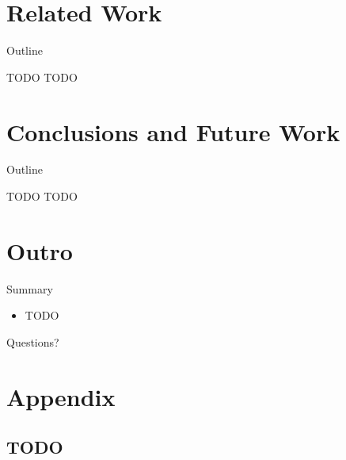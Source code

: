 \note{
}


\section{Related Work}

\begin{frame}{Outline}
  \tableofcontents[current]
\end{frame}

\note{
}

\begin{frame}{TODO}
  TODO
\end{frame}

\note{
}


\section{Conclusions and Future Work}

\begin{frame}{Outline}
  \tableofcontents[current]
\end{frame}

\note{
}

\begin{frame}{TODO}
  TODO
\end{frame}

\note{
}


\section*{Outro}

\begin{frame}{Summary}
  \begin{itemize}
  \item TODO
  \end{itemize}
\end{frame}

\note{
}

\begin{frame}
  \begin{center}
    \huge Questions?
  \end{center}
\end{frame}

\note{
}


\appendix

\section{Appendix}

\subsection{TODO}

